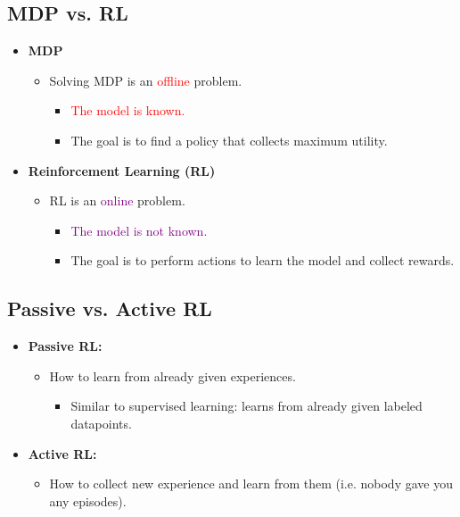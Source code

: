\subsection{MDP vs. RL}
\begin{intuition}
    \begin{itemize}
        \item \textbf{MDP}
        \begin{itemize}
            \item Solving MDP is an \textcolor{red}{offline} problem.
            \begin{itemize}
                \item \textcolor{red}{The model is known.}
                \item The goal is to find a policy that collects maximum utility.
            \end{itemize}
        \end{itemize}
        \item \textbf{Reinforcement Learning (RL)}
        \begin{itemize}
            \item RL is an \textcolor{purple}{online} problem.
            \begin{itemize}
                \item \textcolor{purple}{The model is not known.}
                \item The goal is to perform actions to learn the model and collect rewards.
            \end{itemize}
        \end{itemize}
    \end{itemize}
\end{intuition}

\subsection{Passive vs. Active RL}
\begin{definition}
    \begin{itemize}
        \item \textbf{Passive RL:}
        \begin{itemize}
            \item How to learn from already given experiences.
            \begin{itemize}
                \item Similar to supervised learning: learns from already given labeled datapoints.
            \end{itemize}
        \end{itemize}
        \item \textbf{Active RL:}
        \begin{itemize}
            \item How to collect new experience and learn from them (i.e. nobody gave you any episodes).
        \end{itemize}
    \end{itemize}
\end{definition}

